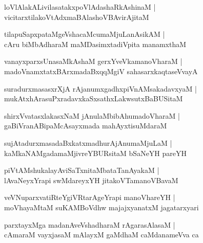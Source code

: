 \documentclass[twoside,12pt,openright]{book}
\newcounter{shloka}[chapter]
\begin{document}
\begin{shloka}%
loVlAlakALivilasatakxpoVlAdashaRkAshinaM |\\
vicitarxtilakoVtAdxmaBAlashoVBAvirAjitaM 
\end{shloka}

\begin{shloka}%
tilapuSapxpataMgeVshacaMcumaMjuLanAsikAM |\\
cAru biMbAdharaM maMDasimxtadiVpita manamxthaM 
\end{shloka}

\begin{shloka}%
vanayxparxsUnasaMkAshaM gerxYveVkamanoVharaM |\\
madoVnamxtatxBArxmadaBxqqMgiV sahasarxkaqtaseVvayA 
\end{shloka}

\begin{shloka}%
suradurxmasasxrXjA rAjanumxgadhxpiVnAMsakadavxyaM |\\
mukAtxhArasuPxradavxkaSxsathxLakwsutxBaBUSitaM
\end{shloka}

\begin{shloka}%
shirxVvatasxlakasxNaM jAnulaMbibAhumadoVharaM |\\
gaBiVranABipaMcAsayxmada mahAyxtisuMdaraM 
\end{shloka}

\begin{shloka}%
sujAtadurxmasadaBxkatxmadhurAjAnumaMjuLaM |\\
kaMkaNAMgadamaMjivreYBURsitaM bSaNeYH pareYH
\end{shloka}

\begin{shloka}%
piVtAMshukalayAviSaTxnitaMbataTanAyakaM |\\
lAvaNeyxYrapi swMdareyxYH jitakoVTamanoVBavaM 
\end{shloka}

\begin{shloka}%
veVNuparxvatiRteYgiVRtarAgeYrapi manoVhareYH |\\
moVhayaMtaM suKAMBoVdhw majajxyanatxM jagatarxyari 
\end{shloka}

\begin{shloka}%
parxtayxMga madanAveVshadharaM rAgarasAlasaM |\\
cAmaraM vayxjasaM mAlayxM gaMdhaM caMdanameVva ca 
\end{shloka}
\end{document}
